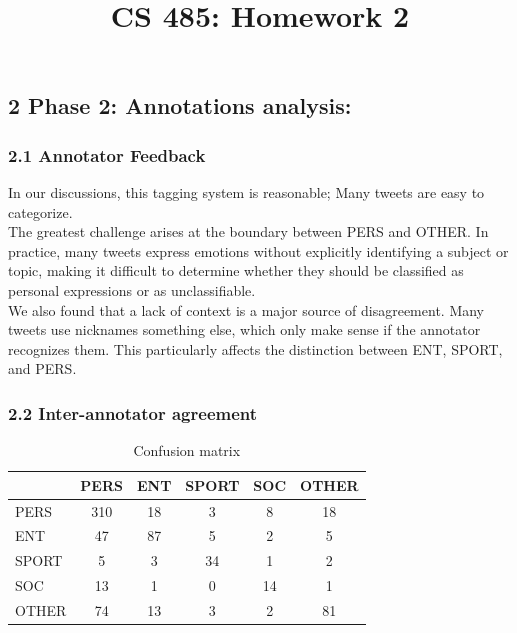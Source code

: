 \documentclass[11pt]{article}
\title{CS 485: Homework 2}
\date{}
\begin{document}
\maketitle
\thispagestyle{fancy}

\noindent \subsection*{2 Phase 2: Annotations analysis:}
\noindent \subsubsection*{2.1 Annotator Feedback} 

In our discussions, this tagging system is reasonable; Many tweets are easy to categorize.\\

\noindent The greatest challenge arises at the boundary between PERS and OTHER. In practice, many tweets express emotions without explicitly identifying a subject or topic, making it difficult to determine whether they should be classified as personal expressions or as unclassifiable. \\

\noindent We also found that a lack of context is a major source of disagreement. Many tweets use nicknames something else, which only make sense if the annotator recognizes them. This particularly affects the distinction between ENT, SPORT, and PERS.

\subsubsection*{2.2 Inter-annotator agreement}
\begin{table}[htbp]
\centering
\begin{tabular}{lccccc}
\hline
      & PERS & ENT & SPORT & SOC & OTHER \\
\hline
PERS  & 310  & 18  & 3     & 8   & 18    \\
ENT   & 47   & 87  & 5     & 2   & 5     \\
SPORT & 5    & 3   & 34    & 1   & 2     \\
SOC   & 13   & 1   & 0     & 14  & 1     \\
OTHER & 74   & 13  & 3     & 2   & 81    \\
\hline
\end{tabular}
\caption{Confusion matrix}
\label{tab:confusion-matrix}
\end{table}
\end{document}
